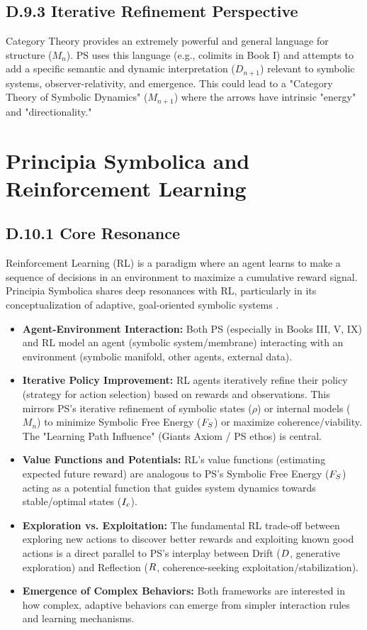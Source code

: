 \subsection*{D.9.3 Iterative Refinement Perspective}
\label{subsec:appD_category_theory_iterative_refinement_perspective}
Category Theory provides an extremely powerful and general language for structure (\(M_n\)). PS uses this language (e.g., colimits in Book I) and attempts to add a specific semantic and dynamic interpretation (\(D_{n+1}\)) relevant to symbolic systems, observer-relativity, and emergence. This could lead to a "Category Theory of Symbolic Dynamics" (\(M_{n+1}\)) where the arrows have intrinsic "energy" and "directionality."
\section*{Principia Symbolica and Reinforcement Learning} \label{sec:appD_ps_and_reinforcement_learning}
\subsection*{D.10.1 Core Resonance}
\label{subsec:appD_rl_core_resonance}
Reinforcement Learning (RL) is a paradigm where an agent learns to make a sequence of decisions in an environment to maximize a cumulative reward signal. Principia Symbolica shares deep resonances with RL, particularly in its conceptualization of adaptive, goal-oriented symbolic systems \cite{sutton2018}.
\begin{itemize}
    \item \textbf{Agent-Environment Interaction:} Both PS (especially in Books III, V, IX) and RL model an agent (symbolic system/membrane) interacting with an environment (symbolic manifold, other agents, external data).
    \item \textbf{Iterative Policy Improvement:} RL agents iteratively refine their policy (strategy for action selection) based on rewards and observations. This mirrors PS's iterative refinement of symbolic states (\(\rho\)) or internal models (\(M_n\)) to minimize Symbolic Free Energy (\(F_S\)) or maximize coherence/viability. The "Learning Path Influence" (Giants Axiom / PS ethos) is central.
    \item \textbf{Value Functions and Potentials:} RL's value functions (estimating expected future reward) are analogous to PS's Symbolic Free Energy (\(F_S\)) acting as a potential function that guides system dynamics towards stable/optimal states (\(I_c\)).
    \item \textbf{Exploration vs. Exploitation:} The fundamental RL trade-off between exploring new actions to discover better rewards and exploiting known good actions is a direct parallel to PS's interplay between Drift (\(D\), generative exploration) and Reflection (\(R\), coherence-seeking exploitation/stabilization).
    \item \textbf{Emergence of Complex Behaviors:} Both frameworks are interested in how complex, adaptive behaviors can emerge from simpler interaction rules and learning mechanisms.
\end{itemize}
